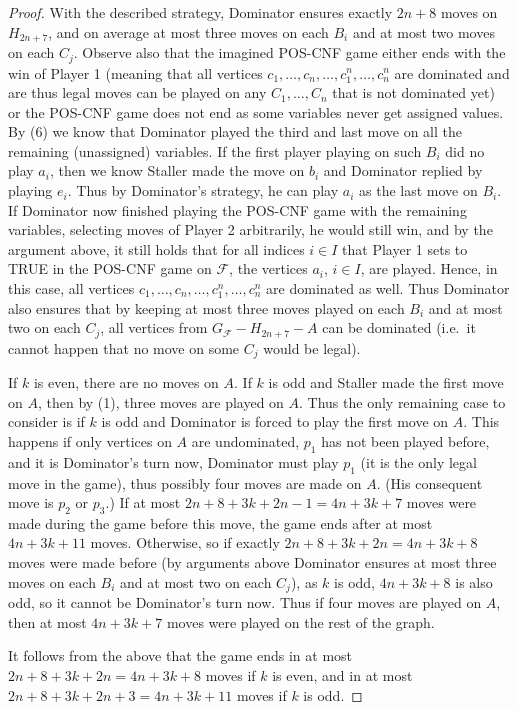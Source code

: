 \documentclass[10pt,a4paper]{amsart}
\newcommand{\F}{\mathcal{F}}
\begin{document}
\begin{proof}
	With the described strategy, Dominator ensures exactly $2n+8$ moves on $H_{2n+7}$, and on average at most three moves on each $B_i$ and at most two moves on each $C_j$. Observe also that the imagined POS-CNF game either ends with the win of Player 1 (meaning that all vertices $c_1, \ldots, c_n, \ldots, c_1^n, \ldots, c_n^n$ are dominated and are thus legal moves can be played on any $C_1, \ldots, C_n$ that is not dominated yet) or the POS-CNF game does not end as some variables never get assigned values. By (6) we know that Dominator played the third and last move on all the remaining (unassigned) variables. If the first player playing on such $B_i$ did no play $a_i$, then we know Staller made the move on $b_i$ and Dominator replied by playing $e_i$. Thus by Dominator's strategy, he can play $a_i$ as the last move on $B_i$. If Dominator now finished playing the POS-CNF game with the remaining variables, selecting moves of Player 2 arbitrarily, he would still win, and by the argument above, it still holds that for all indices $i \in I$ that Player 1 sets to TRUE in the POS-CNF game on $\F$, the vertices $a_i$, $i \in I$, are played. Hence, in this case, all vertices $c_1, \ldots, c_n, \ldots, c_1^n, \ldots, c_n^n$ are dominated as well. Thus Dominator also ensures that by keeping at most three moves played on each $B_i$ and at most two on each $C_j$, all vertices from $G_\F - H_{2n+7} - A$ can be dominated (i.e.\ it cannot happen that no move on some $C_j$ would be legal). 
	
	If $k$ is even, there are no moves on $A$. If $k$ is odd and Staller made the first move on $A$, then by (1), three moves are played on $A$. Thus the only remaining case to consider is if $k$ is odd and Dominator is forced to play the first move on $A$. 	This happens if only vertices on $A$ are undominated, $p_1$ has not been played before, and it is Dominator's turn now, Dominator must play $p_1$ (it is the only legal move in the game), thus possibly four moves are made on $A$. (His consequent move is $p_2$ or $p_3$.) If at most $2n+8+3k+2n-1 = 4n+3k+7$ moves were made during the game before this move, the game ends after at most $4n+3k+11$ moves. Otherwise, so if exactly $2n+8+3k+2n = 4n+3k+8$ moves were made before (by arguments above Dominator ensures at most three moves on each $B_i$ and at most two on each $C_j$), as $k$ is odd, $4n+3k+8$ is also odd, so it cannot be Dominator's turn now. Thus if four moves are played on $A$, then at most $4n+3k+7$ moves were played on the rest of the graph.

	It follows from the above that the game ends in at most $2n+8+3k+2n = 4n+3k+8$ moves if $k$ is even, and in at most $2n+8+3k+2n+3=4n+3k+11$ moves if $k$ is odd.	
\end{proof}
\end{document}
